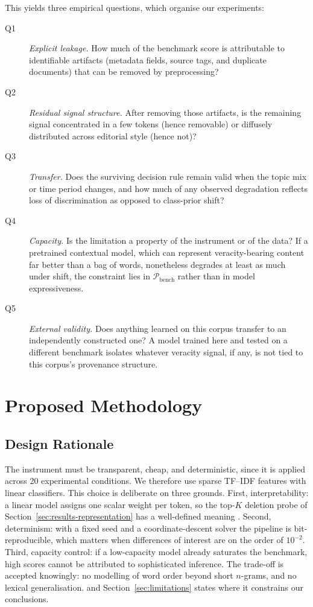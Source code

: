 \documentclass[conference]{IEEEtran}
\begin{document}
This yields three empirical questions, which organise our experiments:
\begin{description}
  \item[Q1] \emph{Explicit leakage.} How much of the benchmark score is
    attributable to identifiable artifacts (metadata fields, source tags, and
    duplicate documents) that can be removed by preprocessing?
  \item[Q2] \emph{Residual signal structure.} After removing those artifacts,
    is the remaining signal concentrated in a few tokens (hence removable) or
    diffusely distributed across editorial style (hence not)?
  \item[Q3] \emph{Transfer.} Does the surviving decision rule remain valid when
    the topic mix or time period changes, and how much of any observed
    degradation reflects loss of discrimination as opposed to class-prior
    shift?
  \item[Q4] \emph{Capacity.} Is the limitation a property of the instrument or
    of the data? If a pretrained contextual model, which can represent
    veracity-bearing content far better than a bag of words, nonetheless
    degrades at least as much under shift, the constraint lies in
    $\mathcal{P}_{\text{bench}}$ rather than in model expressiveness.
  \item[Q5] \emph{External validity.} Does anything learned on this corpus
    transfer to an independently constructed one? A model trained here and
    tested on a different benchmark isolates whatever veracity signal, if any,
    is not tied to this corpus's provenance structure.
\end{description}

\section{Proposed Methodology}
\label{sec:method}

\subsection{Design Rationale}
The instrument must be transparent, cheap, and deterministic, since it is
applied across 20 experimental conditions. We therefore use sparse TF--IDF
features with linear classifiers. This choice is deliberate on three grounds.
First, interpretability: a linear model assigns one scalar weight per token, so
the top-$K$ deletion probe of Section~\ref{sec:results-representation} has a
well-defined meaning \cite{ribeiro2016why}. Second, determinism: with a fixed seed and a
coordinate-descent solver the pipeline is bit-reproducible, which matters when
differences of interest are on the order of $10^{-2}$. Third, capacity control:
if a low-capacity model already saturates the benchmark, high scores cannot be
attributed to sophisticated inference. The trade-off is accepted knowingly: no modelling of word
order beyond short $n$-grams, and no lexical generalisation. and Section~\ref{sec:limitations} states where it constrains our
conclusions.
\end{document}
